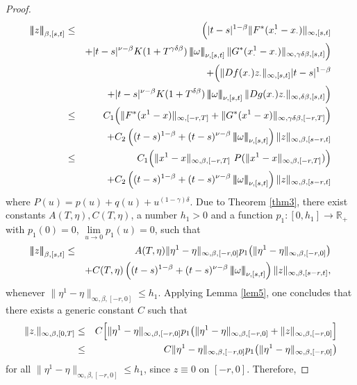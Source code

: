\documentclass[graybox]{svmult}
\newcommand{\R}{\ensuremath{\mathbb{R}}}
\newcommand{\ltn}{\ensuremath{\left| \! \left| \! \left|}}
\newcommand{\rtn}{\ensuremath{\right| \! \right| \! \right|}}
\begin{document}
\begin{proof}
	\begin{eqnarray}\label{thm4eq1}
	\ltn z\rtn_{\beta,[s,t]} &\leq& \Big(|t-s|^{1-\beta}  \|F^*(x_\cdot^1-x_\cdot)\|_{\infty,[s,t]} \notag\\
	&& + |t-s|^{\nu-\beta} K(1+T^{\gamma\delta\beta}) \ltn \omega \rtn_{\nu,[s,t]} \|G^*(x^1_\cdot-x_\cdot)\|_{\infty,\gamma\delta\beta,[s,t]} \Big) \notag\\
	&&+ \Big( \|Df(x_\cdot)z_\cdot \|_{\infty,[s,t]} |t-s|^{1-\beta} \notag\\
	&&+ |t-s|^{\nu-\beta} K(1+T^{\delta\beta}) \ltn \omega \rtn_{\nu,[s,t]} \|Dg(x_\cdot)z_\cdot\|_{\infty,\delta\beta,[s,t]}\Big)\notag\\
	&\leq& C_1\Big(\|F^*(x^1-x)\|_{\infty,[-r,T]} + \|G^*(x^1-x)\|_{\infty,\gamma\delta\beta,[-r,T]}\Big)\notag\\
	&&+C_2\left((t-s)^{1-\beta}+(t-s)^{\nu-\beta}\ltn\omega\rtn_{\nu,[s,t]}\right)\|z\|_{\infty,\beta,[s-r,t]}\notag\\
	&\leq& C_1\Big(\|x^1-x\|_{\infty,\beta,[-r,T]}\  P(\|x^1-x\|_{\infty,\beta,[-r,T]})\Big)\notag\\
	&&+C_2\left((t-s)^{1-\beta}+(t-s)^{\nu-\beta}\ltn\omega\rtn_{\nu,[s,t]}\right)\|z\|_{\infty,\beta,[s-r,t]}
	\end{eqnarray}
	where $P(u) = p(u)+q(u) + u^{(1-\gamma)\delta}$. Due to Theorem \ref{thm3}, there exist constants $A(T,\eta), C(T,\eta)$, a number $h_1>0$  and a function $p_1: [0,h_1] \to \R_+$ with $p_1(0)=0$, $\lim \limits_{u \to 0} p_1(u) =0$, such that
	\begin{eqnarray*}
		\ltn z\rtn_{\beta,[s,t]} &\leq&  A(T,\eta)\|\eta^1 - \eta\|_{\infty,\beta,[-r,0]}  p_1\big(\|\eta^1 - \eta\|_{\infty,\beta,[-r,0]}\big) \\
		&&+ C(T,\eta) \left((t-s)^{1-\beta}+(t-s)^{\nu-\beta}\ltn\omega\rtn_{\nu,[s,t]}\right)\|z\|_{\infty,\beta,[s-r,t]},
	\end{eqnarray*}
	whenever $\|\eta^1 - \eta\|_{\infty,\beta,[-r,0]} \leq h_1$.
	Applying Lemma \ref{lem5}, one concludes that there exists a generic constant $C$ such that
	\begin{eqnarray*}
		\|z_.\|_{\infty,\beta,[0,T]} &\leq& C\Big[\|\eta^1 - \eta\|_{\infty,\beta,[-r,0]} p_1\big(\|\eta^1 - \eta\|_{\infty,\beta,[-r,0]} + \|z\|_{\infty,\beta,[-r,0]}\Big]\notag\\
		&\leq& C\|\eta^1 - \eta\|_{\infty,\beta,[-r,0]} p_1\big(\|\eta^1 - \eta\|_{\infty,\beta,[-r,0]}\big) 
	\end{eqnarray*}
	for all $\|\eta^1 - \eta\|_{\infty,\beta,[-r,0]} \leq h_1$, since $z \equiv 0$ on $[-r,0]$. Therefore, 

\end{proof}
\end{document}
